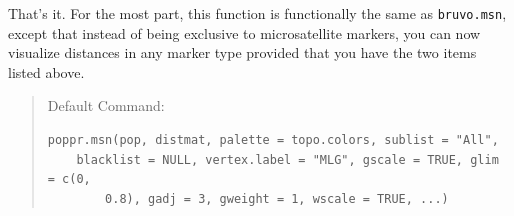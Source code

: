 \documentclass[letterpaper]{article}\usepackage[]{graphicx}\usepackage[]{color}
\makeatletter
\newenvironment{kframe}{%
 \def\at@end@of@kframe{}%
 \ifinner\ifhmode%
  \def\at@end@of@kframe{\end{minipage}}%
  \begin{minipage}{\columnwidth}%
 \fi\fi%
 \def\FrameCommand##1{\hskip\@totalleftmargin \hskip-\fboxsep
 \colorbox{shadecolor}{##1}\hskip-\fboxsep
     \hskip-\linewidth \hskip-\@totalleftmargin \hskip\columnwidth}%
 \MakeFramed {\advance\hsize-\width
   \@totalleftmargin\z@ \linewidth\hsize
   \@setminipage}}%
 {\par\unskip\endMakeFramed%
 \at@end@of@kframe}
\newenvironment{knitrout}{}{} %
\newcommand{\tab}{\hspace*{1em}}
\makeatother
\begin{document}
That's it. For the most part, this function is functionally the same as \texttt{bruvo.msn}, except that instead of being exclusive to microsatellite markers, you can now visualize distances in any marker type provided that you have the two items listed above.

\begin{quote}
Default Command:
\begin{knitrout}
\color{fgcolor}\begin{kframe}
\begin{verbatim}
poppr.msn(pop, distmat, palette = topo.colors, sublist = "All", 
    blacklist = NULL, vertex.label = "MLG", gscale = TRUE, glim = c(0, 
        0.8), gadj = 3, gweight = 1, wscale = TRUE, ...)
\end{verbatim}
\end{kframe}
\end{knitrout}

\end{quote}
\end{document}
